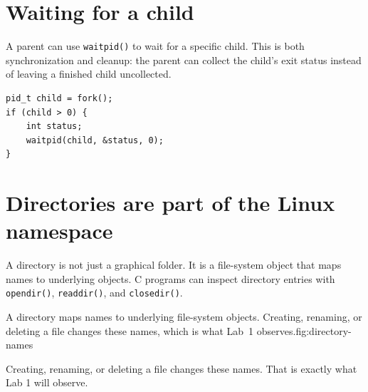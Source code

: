 \section{Waiting for a child}
A parent can use \texttt{waitpid()} to wait for a specific child. This is both synchronization and cleanup: the parent can collect the child's exit status instead of leaving a finished child uncollected.

\begin{lstlisting}[style=utpc]
pid_t child = fork();
if (child > 0) {
    int status;
    waitpid(child, &status, 0);
}
\end{lstlisting}

\section{Directories are part of the Linux namespace}
A directory is not just a graphical folder. It is a file-system object that maps names to underlying objects. C programs can inspect directory entries with \texttt{opendir()}, \texttt{readdir()}, and \texttt{closedir()}.

\begin{utpfig}{A directory maps names to underlying file-system objects. Creating, renaming, or deleting a file changes these names, which is what Lab~1 observes.}{fig:directory-names}
\end{utpfig}

Creating, renaming, or deleting a file changes these names. That is exactly what Lab 1 will observe.

